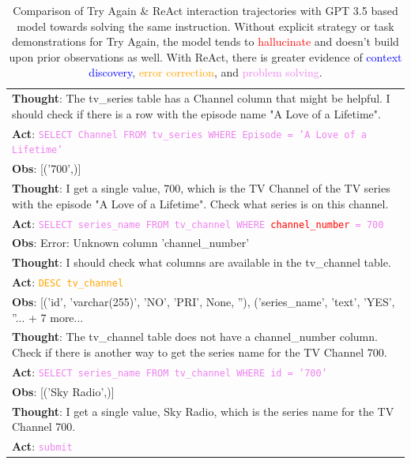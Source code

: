 \begin{table}
\begin{minipage}[t]{.49\linewidth}
\begin{tabularx}{\textwidth}{X}
\textbf{Thought}: The tv\_series table has a Channel column that might be helpful. I should check if there is a row with the episode name "A Love of a Lifetime". \\
\textbf{Act}: \textcolor{violet}{\texttt{SELECT Channel FROM tv\_series WHERE Episode = 'A Love of a Lifetime'}} \\
\textbf{Obs}: [('700',)] \\
\textbf{Thought}: I get a single value, 700, which is the TV Channel of the TV series with the episode "A Love of a
Lifetime". Check what series is on this channel. \\
\textbf{Act}: \textcolor{violet}{\texttt{SELECT series\_name FROM tv\_channel WHERE \textcolor{red}{channel\_number} = 700}} \\
\textbf{Obs}: Error: Unknown column 'channel\_number' \\
\textbf{Thought}: I should check what columns are available in the tv\_channel table. \\
\textbf{Act}: \textcolor{orange}{\texttt{DESC tv\_channel}} \\
\textbf{Obs}: [('id', 'varchar(255)', 'NO', 'PRI', None, ''), ('series\_name', 'text', 'YES', ''... + 7 more... \\
\textbf{Thought}: The tv\_channel table does not have a channel\_number column. Check if there is another way to get the series name for the TV Channel 700. \\
\textbf{Act}: \textcolor{violet}{\texttt{SELECT series\_name FROM tv\_channel WHERE id = '700'}} \\
\textbf{Obs}: [('Sky Radio',)] \\
\textbf{Thought}: I get a single value, Sky Radio, which is the series name for the TV Channel 700. \\
\textbf{Act}: \textcolor{violet}{\texttt{submit}} \\
\bottomrule
\end{tabularx}
\end{minipage}

\vspace{0.5em}
\caption{Comparison of Try Again \& ReAct interaction trajectories with GPT 3.5 based model towards solving the same instruction. Without explicit strategy or task demonstrations for Try Again, the model tends to \textcolor{red}{hallucinate} and doesn't build upon prior observations as well. With ReAct, there is greater evidence of \textcolor{blue}{context discovery}, \textcolor{orange}{error correction}, and \textcolor{violet}{problem solving}.}
\label{table:expr-traj-analysis}
\vspace{-2em}
\end{table}